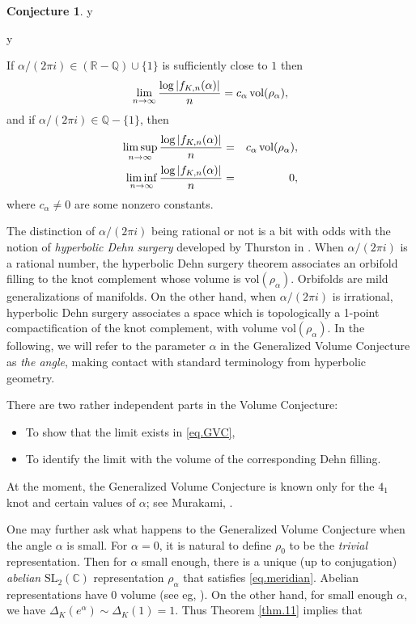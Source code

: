 \documentclass{amsart}
\theoremstyle{definition}
\newtheorem{conjecture}[theorem]{Conjecture}
\def\printname#1{
    \if\draft y
        \smash{\makebox[0pt]{\hspace{-0.5in}
            \raisebox{8pt}{\tt\tiny #1}}}
    \fi
}
\def\lbl#1{\label{#1}\printname{#1}}
\def\BQ{\mathbb Q}
\def\BR{\mathbb R}
\def\BC{\mathbb C}
\def\D{\Delta}
\def\a{\alpha}
\def\SL{\mathrm{SL}}
\def\vol{\mathrm{vol}}
\begin{document}
\begin{conjecture}
\lbl{conj.gvc}
\lbl{eq.gvc}
If $\a/(2 \pi i) \in (\BR-\BQ) \cup \{1\}$ is sufficiently close to $1$
then
\begin{equation}
\lbl{eq.GVC}
\lim_{n \to \infty} \frac{\log| f_{K,n}(\a)|}{n} =
c_{\a}\, \vol(\rho_{\a}),
\end{equation}
and if $\a/(2 \pi i) \in \BQ- \{1\}$, then
\begin{eqnarray*}
\lbl{eq.GVCa}
\limsup_{n \to \infty} \frac{\log| f_{K,n}(\a)|}{n} &=&
c_{\a}\, \vol(\rho_{\a}),   \\
\lbl{eq.GVCb}
\liminf_{n \to \infty} \frac{\log| f_{K,n}(\a)|}{n} &=& 0,
\end{eqnarray*}
where $c_{\a} \neq 0$ are some nonzero constants.
\end{conjecture}

The distinction of $\a/(2 \pi i)$ being rational or not is a bit
with odds with the notion of {\em hyperbolic Dehn surgery}
developed by Thurston in \cite{Th}. When
$\a/(2 \pi i) $ is a rational number, the hyperbolic Dehn surgery
theorem associates an orbifold filling to the knot complement whose
volume is $\vol(\rho_{\a})$. Orbifolds are mild generalizations of
manifolds. On the other hand, when $\a/(2 \pi i)$ is irrational,
hyperbolic Dehn surgery associates a space which is topologically a
1-point compactification of the knot complement, with volume
$\vol(\rho_{\a})$. In the following, we will refer to the parameter
$\a$ in the Generalized Volume Conjecture as {\em the angle}, making
contact with standard terminology from hyperbolic geometry.


There are two rather independent parts in the Volume Conjecture:
\begin{itemize}
\item[(a)]
To show that the limit exists in \eqref{eq.GVC},
\item[(b)]
To identify the limit with the volume of the corresponding Dehn filling.
\end{itemize}

At the moment, the Generalized Volume Conjecture is known only for the $4_1$
knot and certain values of $\a$; see Murakami, \cite{M1}.




One may further ask what happens to the Generalized Volume
Conjecture when the angle $\a$ is small. For $\a=0$, it is natural
to define $\rho_0$ to be the {\em trivial} representation. Then for
$\a$ small enough, there is a unique (up to conjugation) {\em
abelian} $\SL_2(\BC)$ representation $\rho_{\a}$ that satisfies
\eqref{eq.meridian}.
Abelian representations have $0$ volume (see eg, \cite{CCGLS}).
On the other hand, for small enough
$\a$, we have $\D_K(e^{\a}) \sim \D_K(1)=1$. Thus Theorem \ref{thm.11}
implies that
\end{document}
